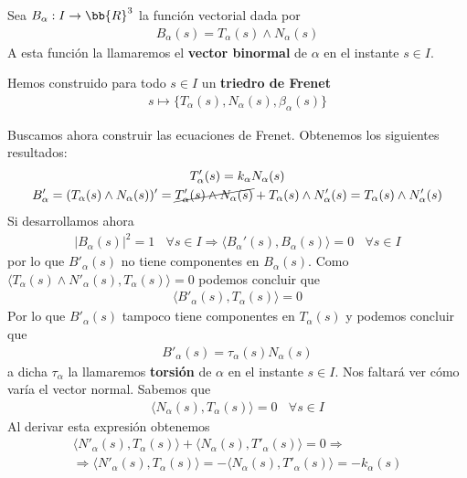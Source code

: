 Sea $B_\alpha:I\to \bb{R}^3$ la función vectorial dada por 
\begin{gather*}
    B_\alpha(s) = T_\alpha(s) \wedge N_\alpha(s)
\end{gather*} 
A esta función la llamaremos el \textbf{vector binormal} de $\alpha$ en el instante $s\in I$.

Hemos construido para todo $s\in I$ un \textbf{triedro de Frenet}
\begin{gather*}
    s \mapsto \{T_\alpha(s), N_\alpha(s), \beta_\alpha(s)\}
\end{gather*}

Buscamos ahora construir las {ecuaciones de Frenet}. Obtenemos los siguientes resultados:
\begin{gather*}
    T'_\alpha(s) = k_\alpha N_\alpha(s)\\
    B'_\alpha = (T_\alpha(s) \wedge N_\alpha(s))' = \cancel{T'_\alpha(s)\wedge N_\alpha(s)} + T_\alpha(s)\wedge N'_\alpha(s) = T_\alpha(s)\wedge N'_\alpha(s)
\end{gather*}
Si desarrollamos ahora 
\begin{gather*}
    |B_\alpha(s)|^2 = 1 \ \ \ \ \forall s \in I \Rightarrow \langle B_\alpha'(s), B_\alpha(s) \rangle = 0 \ \ \ \ \forall s \in I
\end{gather*}
por lo que $B'_\alpha(s)$ no tiene componentes en $B_\alpha(s)$. Como $\langle T_\alpha(s) \wedge N'_\alpha(s), T_\alpha(s)\rangle = 0$ podemos concluir que
\begin{gather*}
    \langle B'_\alpha(s), T_\alpha(s) \rangle = 0
\end{gather*}
Por lo que $B'_\alpha(s)$ tampoco tiene componentes en $T_\alpha(s)$ y podemos concluir que 
\begin{gather*}
    B'_\alpha(s) = \tau_\alpha(s) N_\alpha(s)
\end{gather*}
a dicha $\tau_\alpha$ la llamaremos \textbf{torsión} de $\alpha$ en el instante $s\in I$. Nos faltará ver cómo varía el vector normal. Sabemos que 
\begin{gather*}
    \langle N_\alpha(s), T_\alpha(s) \rangle = 0 \ \ \ \ \forall s \in I
\end{gather*}
Al derivar esta expresión obtenemos 
\begin{gather*}
    \langle N'_\alpha(s), T_\alpha(s) \rangle + \langle N_\alpha(s), T'_\alpha(s) \rangle = 0 \Rightarrow \\
    \Rightarrow \langle N'_\alpha(s), T_\alpha(s) \rangle = - \langle N_\alpha(s), T'_\alpha(s) \rangle = -k_\alpha(s)
\end{gather*}
